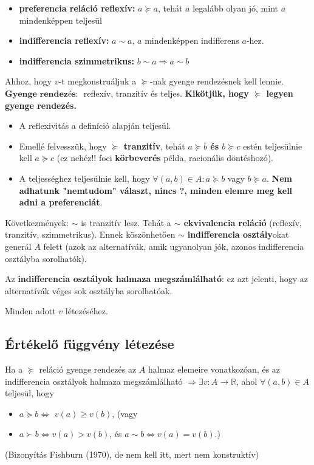 \documentclass[a4paper,12pt]{article}
\begin{document}
\begin{itemize}
\item \textbf{preferencia reláció reflexív: } $a \succeq a $, tehát $a$ legalább olyan jó, mint $a$ mindenképpen teljesül 
\item \textbf{indifferencia reflexív:} $a \sim a $, $a$ mindenképpen indifferens $a$-hez.
\item \textbf{indifferencia szimmetrikus:}  $b \sim a \Rightarrow a \sim b$  
\end{itemize}

Ahhoz, hogy $v$-t megkonstruáljuk a $\succeq$-nak gyenge rendezésnek kell lennie. $\textbf{Gyenge rendezés: }$  reflexív, tranzitív és teljes. \textbf{Kikötjük, hogy $\succeq$ legyen gyenge rendezés.}
\begin{itemize}
\item A reflexivitás a definíció alapján teljesül. 
\item Emellé felvesszük, hogy \textbf{$\succeq$ tranzitív}, tehát \textbf{$a \succeq b$ és $b \succeq c$} estén teljesülnie kell \textbf{$a \succeq c$} (ez nehéz!! foci \textbf{körbeverés} példa, racionális döntéshozó). 
\item A teljességhez teljesülnie kell, hogy $\forall (a,b) \in A: a \succeq b$ vagy $b \succeq a$. \textbf{Nem adhatunk "nemtudom" választ, nincs ?, minden elemre meg kell adni a preferenciát}.  
\end{itemize}
Következmények:  $\sim$ is tranzitív lesz. Tehát a \textbf{$\sim$ ekvivalencia reláció} (reflexív, tranzitív, szimmetrikus). Ennek köszönhetően $\sim$ \textbf{indifferencia osztály}okat generál $A$ felett (azok az alternatívák, amik ugyanolyan jók, azonos indifferencia osztályba sorolhatók).

Az \textbf{indifferencia osztályok halmaza megszámlálható}: ez azt jelenti, hogy az alternatívák véges sok osztályba sorolhatóak.

Minden adott $v$ létezéséhez.

\subsection{Értékelő függvény létezése}

Ha a $\succeq$ reláció gyenge rendezés az $A$ halmaz elemeire vonatkozóan, és az indifferencia osztályok halmaza megszámlálható $\Rightarrow \exists v: A \rightarrow \mathbb{R} $, ahol $\forall(a,b) \in A$ teljesül, hogy 
\begin{itemize}
\item $a \succeq b \Leftrightarrow$  $v(a) \geq v(b)$, (vagy
\item $a \succ b \Leftrightarrow v(a) > v(b)$, és $a \sim  b \Leftrightarrow v(a) = v(b).$)
\end{itemize}
(Bizonyítás Fishburn (1970), de nem kell itt, mert nem konstruktív)
\end{document}

